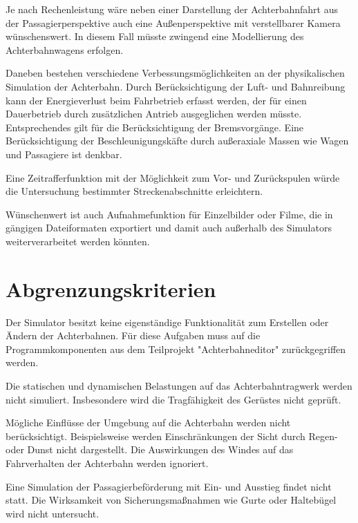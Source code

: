 Je nach Rechenleistung wäre neben einer Darstellung der Achterbahnfahrt aus der Passagierperspektive auch eine Außenperspektive mit verstellbarer Kamera wünschenswert. In diesem Fall müsste zwingend eine Modellierung des Achterbahnwagens erfolgen.

Daneben bestehen verschiedene Verbessungsmöglichkeiten an der physikalischen Simulation der Achterbahn. Durch Berücksichtigung der Luft- und Bahnreibung kann der Energieverlust beim Fahrbetrieb erfasst werden, der für einen Dauerbetrieb durch zusätzlichen Antrieb ausgeglichen werden müsste. Entsprechendes gilt für die Berücksichtigung der Bremsvorgänge. Eine Berücksichtigung der Beschleunigungskäfte durch außeraxiale Massen wie Wagen und Passagiere ist denkbar.

Eine Zeitrafferfunktion mit der Möglichkeit zum Vor- und Zurückspulen würde die Untersuchung bestimmter Streckenabschnitte erleichtern.

Wünschenwert ist auch Aufnahmefunktion für Einzelbilder oder Filme, die in gängigen Dateiformaten exportiert und damit auch außerhalb des Simulators weiterverarbeitet werden könnten.

\section{Abgrenzungskriterien}
Der Simulator besitzt keine eigenständige Funktionalität zum Erstellen oder Ändern der Achterbahnen. Für diese Aufgaben muss auf die Programmkomponenten aus dem Teilprojekt "Achterbahneditor" zurückgegriffen werden.

Die statischen und dynamischen Belastungen auf das Achterbahntragwerk werden nicht simuliert. Insbesondere wird die Tragfähigkeit des Gerüstes nicht geprüft.

Mögliche Einflüsse der Umgebung auf die Achterbahn werden nicht berücksichtigt. Beispielsweise werden Einschränkungen der Sicht durch Regen- oder Dunst nicht dargestellt. Die Auswirkungen des Windes auf das Fahrverhalten der Achterbahn werden ignoriert.

Eine Simulation der Passagierbeförderung mit Ein- und Ausstieg findet nicht statt. Die Wirksamkeit von Sicherungsmaßnahmen wie Gurte oder Haltebügel wird nicht untersucht. 